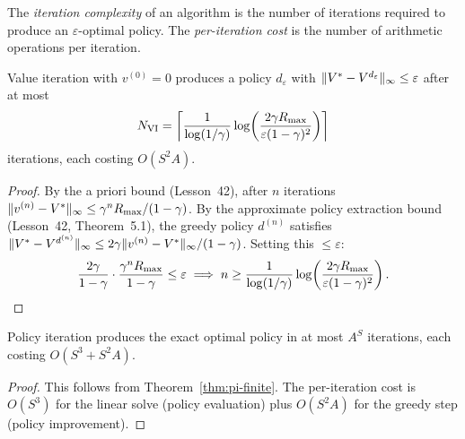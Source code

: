 \documentclass[11pt,a4paper]{article}
\begin{document}
\begin{definition}
\label{def:iteration-complexity}
The \emph{iteration complexity} of an algorithm is the number of
iterations required to produce an $\varepsilon$-optimal policy.
The \emph{per-iteration cost} is the number of arithmetic operations
per iteration.
\end{definition}

\begin{proposition}
\label{prop:vi-complexity}
Value iteration with $v^{(0)} = 0$ produces a policy
$d_\varepsilon$ with $\|V^* - V^{d_\varepsilon}\|_\infty \leq
\varepsilon$ after at most
\[
    N_{\mathrm{VI}} = \left\lceil
    \frac{1}{\log(1/\gamma)}
    \log\!\left(\frac{2\gamma R_{\max}}
    {\varepsilon(1-\gamma)^2}\right)
    \right\rceil
\]
iterations, each costing $O(S^2 A)$.
\end{proposition}

\begin{proof}
By the a priori bound (Lesson~42), after $n$ iterations
$\|v^{(n)} - V^*\|_\infty \leq
\gamma^n R_{\max}/(1-\gamma)$. By the approximate policy
extraction bound (Lesson~42, Theorem~5.1), the greedy policy
$d^{(n)}$ satisfies
$\|V^* - V^{d^{(n)}}\|_\infty \leq
2\gamma \|v^{(n)} - V^*\|_\infty / (1-\gamma)$.
Setting this $\leq \varepsilon$:
\[
    \frac{2\gamma}{1-\gamma} \cdot
    \frac{\gamma^n R_{\max}}{1-\gamma} \leq \varepsilon
    \implies
    n \geq \frac{1}{\log(1/\gamma)}
    \log\!\left(\frac{2\gamma R_{\max}}
    {\varepsilon(1-\gamma)^2}\right). \qedhere
\]
\end{proof}

\begin{proposition}
\label{prop:pi-complexity}
Policy iteration produces the exact optimal policy in at most
$A^S$ iterations, each costing $O(S^3 + S^2 A)$.
\end{proposition}

\begin{proof}
This follows from Theorem~\ref{thm:pi-finite}. The per-iteration
cost is $O(S^3)$ for the linear solve (policy evaluation) plus
$O(S^2 A)$ for the greedy step (policy improvement).
\end{proof}
\end{document}
